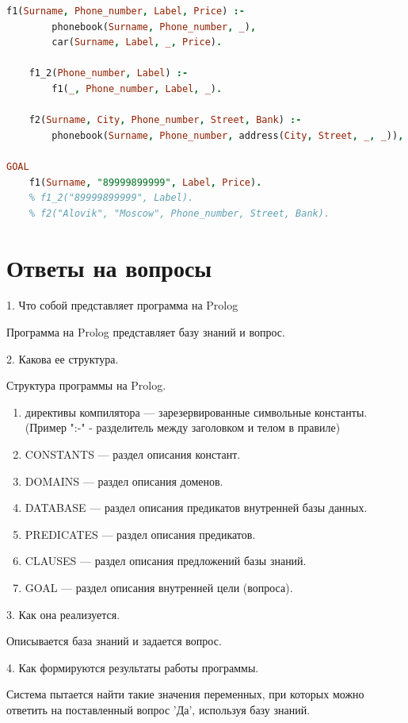 \documentclass[a4paper,oneside,12pt]{extreport}
\begin{document}
\begin{task}
\begin{lstlisting}[language=Prolog]
	f1(Surname, Phone_number, Label, Price) :-  
		phonebook(Surname, Phone_number, _), 
		car(Surname, Label, _, Price). 
		
	f1_2(Phone_number, Label) :- 
		f1(_, Phone_number, Label, _).
	
	f2(Surname, City, Phone_number, Street, Bank) :- 
		phonebook(Surname, Phone_number, address(City, Street, _, _)), bank_depositor(Surname, Bank, _, _).
	
GOAL
	f1(Surname, "89999899999", Label, Price).
	% f1_2("89999899999", Label).
	% f2("Alovik", "Moscow", Phone_number, Street, Bank).
    \end{lstlisting}

\end{task}

\newpage

\section*{Ответы на вопросы}

1. Что собой представляет программа на Prolog

Программа на Prolog представляет базу знаний и вопрос.

2. Какова ее структура. 

Структура программы на Prolog.

\begin{enumerate}
    \item директивы компилятора — зарезервированные символьные константы. (Пример ":-" - разделитель между заголовком и телом в правиле) 
    \item CONSTANTS — раздел описания констант.
    \item DOMAINS — раздел описания доменов.
    \item DATABASE — раздел описания предикатов внутренней базы данных.
    \item PREDICATES — раздел описания предикатов.
    \item CLAUSES — раздел описания предложений базы знаний.
    \item GOAL — раздел описания внутренней цели (вопроса).
\end{enumerate}

3. Как она реализуется.

Описывается база знаний и задается вопрос.

4. Как формируются результаты работы программы. 

Система пытается найти такие значения переменных, при которых можно ответить на поставленный вопрос 'Да', используя базу знаний. %
\end{document}
